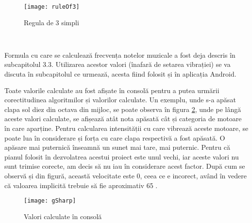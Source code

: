 \documentclass[../IoMusT.tex]{subfiles}
\begin{document}
\begin{figure}[h]
\centering
\texttt{[image: ruleOf3]}
\caption{Regula de 3 simpli}
\label{fig:ruleOf3}
\end{figure}  
\\
\par Formula cu care se calculează frecvența notelor muzicale a fost deja descris în subcapitolul 3.3. Utilizarea acestor valori (înafară de setarea vibrației) se va discuta în subcapitolul ce urmează, acesta fiind folosit și în aplicația Android.
\\
\par Toate valorile calculate au fost afișate în consolă pentru a putea urmării corectitudinea algoritmilor și valorilor calculate. Un exemplu, unde s-a apăsat clapa sol diez din octava din mijloc, se poate observa în figura \ref{fig:gSharp}, unde pe lângă aceste valori calculate, se afișează atât nota apăsată cât și categoria de motoare în care aparține. Pentru calcularea intensității cu care vibrează aceste motoare, se poate lua în considerare și forța cu care clapa respectivă a fost apăsată. O apăsare mai puternică înseamnă un sunet mai tare, mai puternic. Pentru că pianul folosit în dezvolatrea acestui proiect este unul vechi, iar aceste valori nu sunt trimise corecte, am decis să nu iau în considerare acest factor. După cum se observă și din figură, această velocitate este 0, ceea ce e incorect, având în vedere că valoarea implicită trebuie să fie aproximativ 65 \cite{Mido}.
\begin{figure}[h]
\centering
\texttt{[image: gSharp]}
\caption{Valori calculate în consolă}
\label{fig:gSharp}
\end{figure}  
\end{document}
